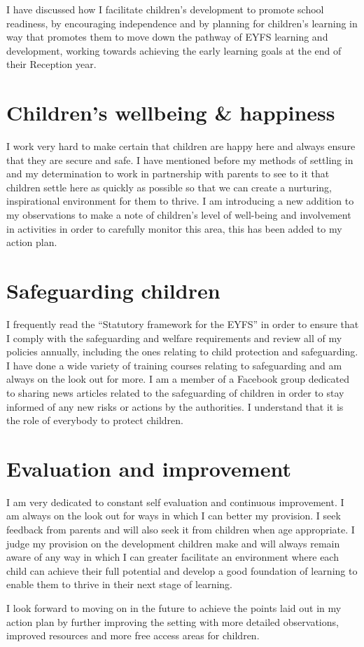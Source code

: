 \documentclass[10pt,a4paper]{report}
\begin{document}
I have discussed how I facilitate children's development to promote school readiness, by encouraging independence and by planning for children's learning in way that promotes them to move down the pathway of EYFS learning and development, working towards achieving the early learning goals at the end of their Reception year. 

\section{Children's wellbeing \& happiness}

I work very hard to make certain that children are happy here and always ensure that they are secure and safe. I have mentioned before my methods of settling in and my determination to work in partnership with parents to see to it that children settle here as quickly as possible so that we can create a nurturing, inspirational environment for them to thrive. I am introducing a new addition to my observations to make a note of children's level of well-being and involvement in activities in order to carefully monitor this area, this has been added to my action plan.

\section{Safeguarding children}

I frequently read the “Statutory framework for the EYFS” in order to ensure that I comply with the safeguarding and welfare requirements and review all of my policies annually, including the ones relating to child protection and safeguarding. I have done a wide variety of training courses relating to safeguarding and am always on the look out for more. I am a member of a Facebook group dedicated to sharing news articles related to the safeguarding of children in order to stay informed of any new risks or actions by the authorities. I understand that it is the role of everybody to protect children.

\section{Evaluation and improvement}

I am very dedicated to constant self evaluation and continuous improvement. I am always on the look out for ways in which I can better my provision. I seek feedback from parents and will also seek it from children when age appropriate. I judge my provision on the development children make and will always remain aware of any way in which I can greater facilitate an environment where each child can achieve their full potential and develop a good foundation of learning to enable them to thrive in their next stage of learning. 

I look forward to moving on in the future to achieve the points laid out in my action plan by further improving the setting with more detailed observations, improved resources and more free access areas for children.
\end{document}

